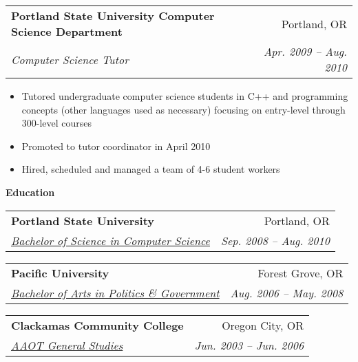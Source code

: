 \documentclass[letterpaper,11pt]{article}
\makeatletter
\newcommand{\resitem}[1]{
  \item #1 \vspace{-2pt}
}
\newcommand{\resheading}[1]{
  {
    \large \colorbox{mygrey}{
      \begin{minipage}{\textwidth}{
        \textbf{#1 \vphantom{p\^{E}}}
      }\end{minipage}
    }
  }
}
\newcommand{\ressubheading}[4]{
  \begin{tabular*}{6.75 in}{l@{\extracolsep{\fill}}r}
    \textbf{#1} & #2 \\
    \textit{#3} & \textit{#4} \\
  \end{tabular*}\vspace{-6pt}
}
\makeatother
\begin{document}
\begin{description}
    \item
      \ressubheading{
        Portland State University Computer Science Department
      } {
        Portland, OR
      } {
        Computer Science Tutor
      } {
        Apr. 2009 -- Aug. 2010
      } { \footnotesize
        \begin{itemize}
          \resitem{
            Tutored undergraduate computer science students in C++ and programming
            concepts (other languages used as necessary) focusing on entry-level
            through 300-level courses
          }
          \resitem{
            Promoted to {\sc t}utor {\sc c}oordinator in April 2010
          }
          \resitem{
            Hired, scheduled and managed a team of 4-6 student workers
          }
        \end{itemize}
      }
        
  \end{description} %
  
\resheading{Education}
  \begin{description}
    \item
      \ressubheading{
        Portland State University
      } {
        Portland, OR
      } {
        \href{http://www.pdx.edu/computerscience}{Bachelor of Science in Computer Science}
      } {
        Sep. 2008 -- Aug. 2010
      }
    \item
      \ressubheading{
        Pacific University
      } {
        Forest Grove, OR
      } {
        \href{http://www.pacificu.edu/as/politics}{Bachelor of Arts in Politics \& Government}
      } {
        Aug. 2006 -- May. 2008
      }
    \item
      \ressubheading{
        Clackamas Community College
      } {
        Oregon City, OR
      } {
        \href{http://www.clackamas.edu/index.aspx}{AAOT General Studies}
      } {
        Jun. 2003 -- Jun. 2006
      }
  \end{description} %
\end{document}
